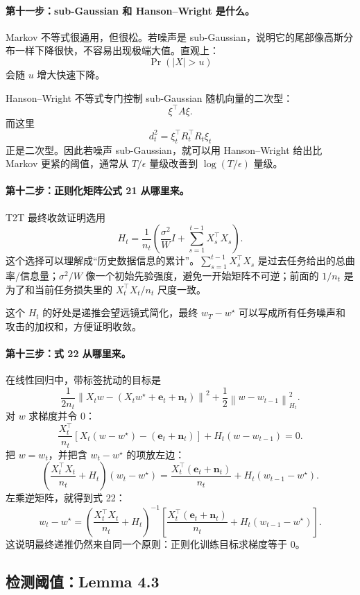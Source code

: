 \documentclass[UTF8,fontset=none,11pt]{ctexart}
\theoremstyle{cnstyle}
\newcommand{\norm}[1]{\left\lVert #1\right\rVert}
\begin{document}
\paragraph{第十一步：sub-Gaussian 和 Hanson--Wright 是什么。}
Markov 不等式很通用，但很松。若噪声是 sub-Gaussian，说明它的尾部像高斯分布一样下降很快，不容易出现极端大值。直观上：
\[
  \Pr(|X|>u)
\]
会随 \(u\) 增大快速下降。

Hanson--Wright 不等式专门控制 sub-Gaussian 随机向量的二次型：
\[
  \xi^\top A\xi.
\]
而这里
\[
  d_t^2
  =
  \xi_t^\top R_t^\top R_t\xi_t
\]
正是二次型。因此若噪声 sub-Gaussian，就可以用 Hanson--Wright 给出比 Markov 更紧的阈值，通常从 \(T/\epsilon\) 量级改善到 \(\log(T/\epsilon)\) 量级。

\paragraph{第十二步：正则化矩阵公式 21 从哪里来。}
T2T 最终收敛证明选用
\[
  H_t=\frac1{n_t}
  \left(
  \frac{\sigma^2}{W}I+\sum_{s=1}^{t-1}X_s^\top X_s
  \right).
\]
这个选择可以理解成“历史数据信息的累计”。\(\sum_{s=1}^{t-1}X_s^\top X_s\) 是过去任务给出的总曲率/信息量；\(\sigma^2/W\) 像一个初始先验强度，避免一开始矩阵不可逆；前面的 \(1/n_t\) 是为了和当前任务损失里的 \(X_t^\top X_t/n_t\) 尺度一致。

这个 \(H_t\) 的好处是递推会望远镜式简化，最终 \(w_T-w^\star\) 可以写成所有任务噪声和攻击的加权和，方便证明收敛。

\paragraph{第十三步：式 22 从哪里来。}
在线性回归中，带标签扰动的目标是
\[
  \frac1{2n_t}\norm{X_tw-(X_tw^\star+\mathbf e_t+\mathbf n_t)}^2
  +\frac12\norm{w-w_{t-1}}_{H_t}^2.
\]
对 \(w\) 求梯度并令 0：
\[
  \frac{X_t^\top}{n_t}
  \left[
  X_t(w-w^\star)-(\mathbf e_t+\mathbf n_t)
  \right]
  +H_t(w-w_{t-1})=0.
\]
把 \(w=w_t\)，并把含 \(w_t-w^\star\) 的项放左边：
\[
  \left(
  \frac{X_t^\top X_t}{n_t}+H_t
  \right)(w_t-w^\star)
  =
  \frac{X_t^\top(\mathbf e_t+\mathbf n_t)}{n_t}
  +H_t(w_{t-1}-w^\star).
\]
左乘逆矩阵，就得到式 22：
\[
  w_t-w^\star
  =
  \left(
  \frac{X_t^\top X_t}{n_t}+H_t
  \right)^{-1}
  \left[
  \frac{X_t^\top(\mathbf e_t+\mathbf n_t)}{n_t}
  +H_t(w_{t-1}-w^\star)
  \right].
\]
这说明最终递推仍然来自同一个原则：正则化训练目标求梯度等于 0。

\subsection{检测阈值：Lemma 4.3}
\end{document}
